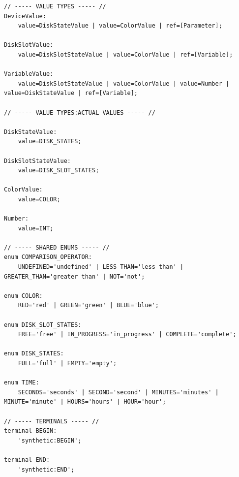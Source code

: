 \begin{verbatim}
// ----- VALUE TYPES ----- //
DeviceValue:
	value=DiskStateValue | value=ColorValue | ref=[Parameter];

DiskSlotValue:
	value=DiskSlotStateValue | value=ColorValue | ref=[Variable];

VariableValue:
	value=DiskSlotStateValue | value=ColorValue | value=Number | value=DiskStateValue | ref=[Variable];

// ----- VALUE TYPES:ACTUAL VALUES ----- //

DiskStateValue:
	value=DISK_STATES;

DiskSlotStateValue:
 	value=DISK_SLOT_STATES;

ColorValue:
	value=COLOR;

Number:
	value=INT;

// ----- SHARED ENUMS ----- //
enum COMPARISON_OPERATOR:
	UNDEFINED='undefined' | LESS_THAN='less than' | GREATER_THAN='greater than' | NOT='not';

enum COLOR:
	RED='red' | GREEN='green' | BLUE='blue';

enum DISK_SLOT_STATES:
	FREE='free' | IN_PROGRESS='in_progress' | COMPLETE='complete';

enum DISK_STATES:
	FULL='full' | EMPTY='empty';

enum TIME:
	SECONDS='seconds' | SECOND='second' | MINUTES='minutes' | MINUTE='minute' | HOURS='hours' | HOUR='hour';

// ----- TERMINALS ----- //
terminal BEGIN:
	'synthetic:BEGIN';

terminal END:
	'synthetic:END';
\end{verbatim}

